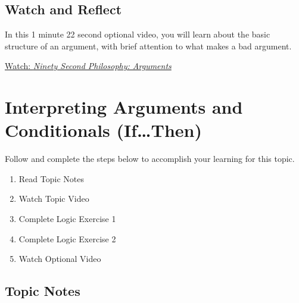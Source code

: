 \documentclass[
]{book}
\providecommand{\tightlist}{%
  \setlength{\itemsep}{0pt}\setlength{\parskip}{0pt}}
\begin{document}
\begin{reflect}
\end{reflect}

\hypertarget{watch-and-reflect-16}{%
\subsection*{Watch and Reflect}\label{watch-and-reflect-16}}

\begin{reflect}
In this 1 minute 22 second optional video, you will learn about the basic structure of an argument, with brief attention to what makes a bad argument.

\href{https://www.youtube.com/watch?v=Z7f_uuy1JcM}{Watch: \emph{Ninety Second Philosophy: Arguments}}
\end{reflect}

\hypertarget{interpreting-arguments-and-conditionals-ifthen}{%
\section{Interpreting Arguments and Conditionals (If\ldots Then)}\label{interpreting-arguments-and-conditionals-ifthen}}

Follow and complete the steps below to accomplish your learning for this topic.

\begin{enumerate}
\def\labelenumi{\arabic{enumi}.}
\tightlist
\item
  Read Topic Notes\\
\item
  Watch Topic Video\\
\item
  Complete Logic Exercise 1\\
\item
  Complete Logic Exercise 2\\
\item
  Watch Optional Video
\end{enumerate}

\hypertarget{topic-notes-10}{%
\subsection*{Topic Notes}\label{topic-notes-10}}
\end{document}
